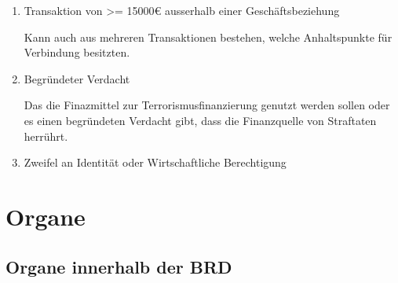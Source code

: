 \documentclass{article}
\begin{document}
        \begin{enumerate}

            \item Transaktion von >= 15000€ ausserhalb einer Geschäftsbeziehung
                
                Kann auch aus mehreren Transaktionen bestehen, welche Anhaltspunkte für Verbindung besitzten.

            \item Begründeter Verdacht 

                Das die Finazmittel zur Terrorismusfinanzierung genutzt werden sollen oder es einen begründeten Verdacht gibt, dass die Finanzquelle von Straftaten herrührt.

            \item Zweifel an Identität oder Wirtschaftliche Berechtigung

        \end{enumerate}    
    

    \section[Organe]{Organe}


        \subsection[Organe BRD]{Organe innerhalb der BRD}
\end{document}
